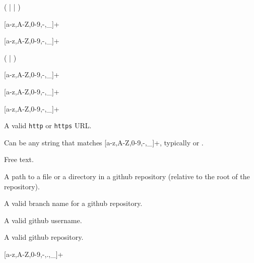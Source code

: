 \bigskip
\noindent
{}

(  |  | )

\bigskip
\noindent
{}

[a-z,A-Z,0-9,-,\_]+

\bigskip
\noindent
{}

[a-z,A-Z,0-9,-,\_]+

\bigskip
\noindent
{}

(  |  )

\bigskip
\noindent
{}

[a-z,A-Z,0-9,-,\_]+

\bigskip
\noindent
{}

[a-z,A-Z,0-9,-,\_]+

\bigskip
\noindent
{}

[a-z,A-Z,0-9,-,\_]+

\bigskip
\noindent
{}

A valid \texttt{http} or \texttt{https} URL.

\bigskip
\noindent
{}

Can be any string that matches [a-z,A-Z,0-9,-,\_]+, typically
 or .

\bigskip
\noindent
{}

Free text.

\bigskip
\noindent
{}

A path to a file or a directory in a github repository (relative to
the root of the repository).

\bigskip
\noindent
{}

A valid branch name for a github repository.

\bigskip
\noindent
{}

A valid github username.

\bigskip
\noindent
{}

A valid github repository.

\bigskip
\noindent
{}

[a-z,A-Z,0-9,-,.,\_]+

\bigskip
\noindent
{}

